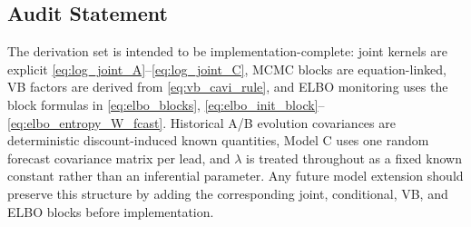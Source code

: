 \subsection{Audit Statement}
The derivation set is intended to be implementation-complete:
joint kernels are explicit \eqref{eq:log_joint_A}--\eqref{eq:log_joint_C},
MCMC blocks are equation-linked, VB factors are derived from \eqref{eq:vb_cavi_rule},
and ELBO monitoring uses the block formulas in \eqref{eq:elbo_blocks},
\eqref{eq:elbo_init_block}--\eqref{eq:elbo_entropy_W_fcast}.
Historical A/B evolution covariances are deterministic discount-induced known quantities,
Model C uses one random forecast covariance matrix per lead,
and $\lambda$ is treated throughout as a fixed known constant rather than an inferential parameter.
Any future model extension should preserve this structure by adding
the corresponding joint, conditional, VB, and ELBO blocks before implementation.
